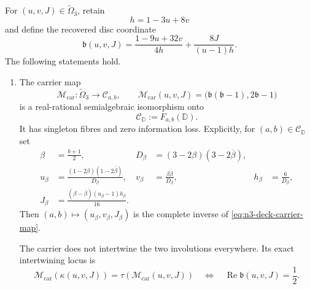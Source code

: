 \begin{theorem}
\label{thm:n3-deck-interface}
For $(u,v,J)\in\widetilde\Omega_3$, retain
\[
 h=1-3u+8v
\]
and define the recovered disc coordinate
\begin{equation}
 \mathfrak b(u,v,J)=
 \frac{1-9u+32v}{4h}+\frac{8J}{(u-1)h}.
 \label{eq:n3-recovered-beta-interface}
\end{equation}
The following statements hold.

\begin{enumerate}
\item The carrier map
\begin{equation}
 \mathcal M_{\mathrm{car}}:\widetilde\Omega_3\longrightarrow\mathcal C_{a,b},
 \qquad
 \mathcal M_{\mathrm{car}}(u,v,J)=
 \bigl(\mathfrak b(\mathfrak b-1),2\mathfrak b-1\bigr)
 \label{eq:n3-deck-carrier-map}
\end{equation}
is a real-rational semialgebraic isomorphism onto
\[
 \mathcal C_{\mathbb D}:=F_{a,b}(\mathbb D).
\]
It has singleton fibres and zero information loss.  Explicitly, for
$(a,b)\in\mathcal C_{\mathbb D}$ set
\begin{align}
 \beta&=\frac{b+1}{2},
 &D_\beta&=(3-2\beta)(3-2\overline\beta),\nonumber\\
 u_\beta&=\frac{(1-2\beta)(1-2\overline\beta)}{D_\beta},
 &v_\beta&=\frac{\beta\overline\beta}{D_\beta},
 &h_\beta&=\frac6{D_\beta},\nonumber\\
 J_\beta&=
 \frac{(\beta-\overline\beta)(u_\beta-1)h_\beta}{16}.
 \label{eq:n3-deck-carrier-inverse}
\end{align}
Then $(a,b)\mapsto(u_\beta,v_\beta,J_\beta)$ is the complete inverse of
\eqref{eq:n3-deck-carrier-map}.

The carrier does not intertwine the two involutions everywhere.  Its exact
intertwining locus is
\begin{equation}
 \mathcal M_{\mathrm{car}}\!\left(\kappa(u,v,J)\right)
 =\tau\!\left(\mathcal M_{\mathrm{car}}(u,v,J)\right)
 \quad\Longleftrightarrow\quad
 \operatorname{Re}\mathfrak b(u,v,J)=\frac12.
 \label{eq:n3-carrier-equivariance-locus}
\end{equation}


\end{enumerate}
\end{theorem}
